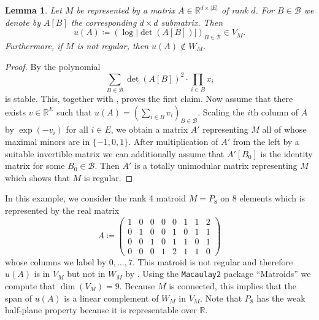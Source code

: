 \documentclass[11pt]{article}
\newtheorem{lem}[theo]{Lemma}
\theoremstyle{definition}
\numberwithin{equation}{section}
\newcommand{\R}{{\mathbb R}}
\newcommand{\cB}{{\mathcal B}}
\begin{document}
\begin{lem}\label{lem:notreg}
    Let $M$ be represented by a matrix $A\in\R^{d\times |E|}$ of rank $d$. For $B\in\cB$ we denote by $A[B]$ the corresponding $d\times d$ submatrix. Then 
    \begin{equation*}
        u(A)\coloneqq (\log|\det(A[B])|)_{B\in\cB}\in V_M.
    \end{equation*}
    Furthermore, if $M$ is not regular, then $u(A)\not\in W_M$.
\end{lem}

\begin{proof}
    By \cite[Theorem~8.1]{HPPlong} the polynomial
    \begin{equation*}
        \sum_{B\in\cB}\det(A[B])^2\cdot\prod_{i\in B}x_i
    \end{equation*}
    is stable. This, together with , proves the first claim. Now assume that there exists $v\in\R^E$ such that $u(A)=(\sum_{i\in B}v_i)_{B\in\cB}$. Scaling the $i$th column of $A$ by $\exp(-v_i)$ for all $i\in E$, we obtain a matrix $A'$ representing $M$ all of whose maximal minors are in $\{-1,0,1\}$. After multiplication of $A'$ from the left by a suitable invertible matrix we can additionally assume that $A'[B_0]$ is the identity matrix for some $B_0\in\cB$. Then $A'$ is a totally unimodular matrix representing $M$ which shows that $M$ is regular.
\end{proof}

\begin{ex}\label{ex:p8}
    In this example, we consider the rank 4 matroid $M=P_8$ on 8 elements which is represented by the real matrix
    \[A\coloneqq \begin{pmatrix}
        1&0&0&0&0&1&1&2\\
        0&1&0&0&1&0&1&1\\
        0&0&1&0&1&1&0&1\\
        0&0&0&1&2&1&1&0
    \end{pmatrix}\]
    whose columns we label by $0,\ldots,7$.
    This matroid is not regular \cite[\S A4]{HPPlong} and therefore $u(A)$ is in $V_M$ but not in $W_M$ by . Using the {\texttt{Macaulay2}} \cite{M2} package ``Matroids'' \cite{MatroidsArticle} we compute that $\dim(V_M)=9$. Because $M$ is connected, this implies that the span of $u(A)$ is a linear complement of $W_M$ in $V_M$. Note that $P_8$ has the weak half-plane property because it is representable over $\R$. 
\end{ex}
\end{document}
